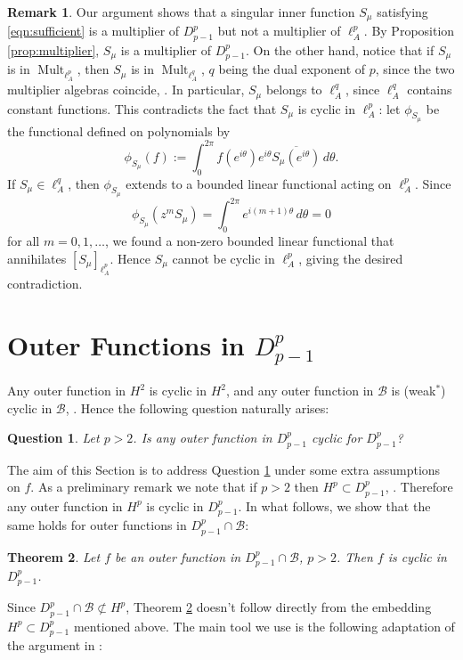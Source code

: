 \documentclass{birkjour}
\numberwithin{equation}{section}
\theoremstyle{plain}
\newtheorem{theo}{Theorem}[section]
\newtheorem{question}{Question}
\theoremstyle{definition}
\newtheorem{rem}[theo]{Remark}
\newcommand{\Mult}{\operatorname{Mult}}
\newcommand{\B}{\mathcal{B}}
\newcommand{\1}{\mathds{1}}
\begin{document}
 
\begin{rem}
\label{rem:multipliers}
Our argument shows that a singular inner function $S_\mu$ satisfying \eqref{eqn:sufficient} is a multiplier of $D^p_{p-1}$ but not a multiplier of $\ell^p_A$. By Proposition \ref{prop:multiplier}, $S_\mu$ is a multiplier of $D^p_{p-1}$. On the other hand, notice that if $S_\mu$ is in $\Mult_{\ell^p_A}$, then $S_\mu$ is in $\Mult_{\ell^q_A}$, $q$ being the dual exponent of $p$, since the two multiplier algebras coincide, \cite{Nikolski66}. In particular, $S_\mu$ belongs to $\ell^q_A$, since $\ell^q_A$ contains constant functions. This contradicts the fact that $S_\mu$ is cyclic in $\ell^p_A$: let $\phi_{S_\mu}$ be the functional defined on polynomials  by
\[
\phi_{S_\mu}(f):=\int_{0}^{2\pi} f(e^{i\theta}) e^{i\theta}\overline{S_\mu(e^{i\theta})}\,d\theta.
\]
If $S_\mu\in\ell_A^q$, then $\phi_{S_\mu}$ extends to a bounded linear functional acting on $\ell^p_A$. Since 
\[
\phi_{S_\mu}(z^mS_\mu)=\int_{0}^{2\pi}e^{i(m+1)\theta}\,d\theta=0
\]
for all $m=0, 1, \dots$, we found a non-zero bounded linear functional that annihilates $[S_\mu]_{\ell^p_A}$. Hence $S_\mu$ cannot be cyclic in $\ell^p_A$, giving the desired contradiction. 
\end{rem}

\section{Outer Functions in $D^p_{p-1}$}
\label{sec:outer}
Any outer function in $H^2$ is cyclic in $H^2$, and any outer function in $\B$ is (weak$^*$) cyclic in $\B$, \cite{Brown91}. Hence the following question naturally arises:
\begin{question}
\label{q:outer}
    Let $p>2$. Is any outer function in $D^p_{p-1}$ cyclic for $D^p_{p-1}$?
\end{question}
The aim of this Section is to address Question \ref{q:outer} under some extra assumptions on $f$. As a preliminary remark we note that if $p>2$ then $H^p\subset D^p_{p-1}$, \cite{Pavlovic}. Therefore any outer function in $H^p$ is cyclic in $D^p_{p-1}$. In what follows, we show that the same holds for outer functions in $D^p_{p-1}\cap\B$:

\begin{theo}
\label{theo:outerBloch}
    Let $f$ be an outer function in $D^p_{p-1}\cap\B$, $p>2$. Then $f$ is cyclic in $D^p_{p-1}$. 
\end{theo}
Since $D^p_{p-1}\cap\B\not\subset H^p$, Theorem \ref{theo:outerBloch} doesn't follow directly from the embedding $H^p\subset D^p_{p-1}$ mentioned above. The main tool we use is the following adaptation of the argument in \cite{Brown91}:
\end{document}

